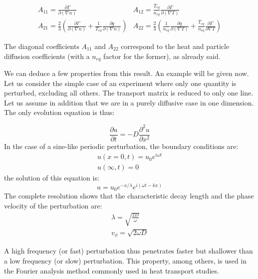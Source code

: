 \[
\begin{array}{ll}
		A_{11} = \frac{\partial\Gamma}{\partial (\nabla n)}		&		A_{12} = \frac{T_{eq}}{n_{eq}} \frac{\partial\Gamma}{\partial(\nabla T)}		\\
		A_{21} = \frac{2}{3}\left( \frac{\partial\Gamma}{\partial (\nabla n)} + \frac{1}{T_{eq}}\frac{\partial q}{\partial (\nabla n)} \right)													&  A_{22} = \frac{2}{3}\left( \frac{1}{n_{eq}}\frac{\partial q}{\partial (\nabla T)} + \frac{T_{eq}}{n_{eq}}\frac{\partial\Gamma}{\partial\nabla T} \right)
\end{array}
\]

The diagonal coefficients $A_{11}$ and $A_{22}$ correspond to the heat and particle diffusion coefficients (with a $n_{eq}$ factor for the former), as already said.

We can deduce a few properties from this result. An example will be given now. Let us consider the simple case of an experiment where only one quantity is perturbed, excluding all others. The transport matrix is reduced to only one line. Let us assume in addition that we are in a purely diffusive case in one dimension. The only evolution equation is thus:

\[
	\frac{\partial u}{\partial t} = -D \frac{\partial^2 u}{\partial x^2}
\]
In the case of a sine-like periodic perturbation, the boundary conditions are:
\[
\begin{array}{ll}
		u(x=0,t) = u_0 e^{i\omega t} \\
		u(\infty, t) = 0
\end{array}
\]
the solution of this equation is:
\[
	u = u_0 e^{-x/\lambda}e^{i(\omega t - kx)}
\]
The complete resolution shows that the characteristic decay length and the phase velocity of the perturbation are:
\begin{eqnarray}
	\lambda = \sqrt{\frac{2D}{\omega}}	\nonumber	\\
	v_\phi = \sqrt{2\omega D}						\nonumber	
\end{eqnarray}

A high frequency (or fast) perturbation thus penetrates faster but shallower than a low frequency (or slow) perturbation. This property, among others, is used in the Fourier analysis method commonly used in heat transport studies.




